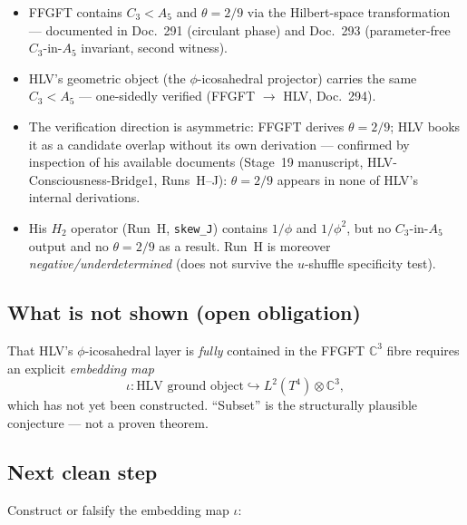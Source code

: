 \begin{itemize}
  \item FFGFT contains $C_3 < A_5$ and $\theta = 2/9$ via the
    Hilbert-space transformation --- documented in Doc.~291 (circulant
    phase) and Doc.~293 (parameter-free $C_3$-in-$A_5$ invariant, second
    witness).
  \item HLV's geometric object (the $\phi$-icosahedral projector) carries
    the same $C_3 < A_5$ --- one-sidedly verified (FFGFT $\to$ HLV,
    Doc.~294).
  \item The verification direction is asymmetric: FFGFT derives $\theta =
    2/9$; HLV books it as a candidate overlap without its own derivation
    --- confirmed by inspection of his available documents (Stage~19
    manuscript, HLV-Consciousness-Bridge1, Runs~H--J): $\theta = 2/9$
    appears in none of HLV's internal derivations.
  \item His $H_2$ operator (Run~H, \texttt{skew\_J}) contains $1/\phi$
    and $1/\phi^2$, but no $C_3$-in-$A_5$ output and no $\theta = 2/9$
    as a result. Run~H is moreover \emph{negative/underdetermined} (does
    not survive the $u$-shuffle specificity test).
\end{itemize}

\subsection*{What is not shown (open obligation)}

That HLV's $\phi$-icosahedral layer is \emph{fully} contained in the
FFGFT $\mathbb{C}^3$ fibre requires an explicit \emph{embedding map}
\begin{equation}
  \iota\colon \text{HLV ground object} \hookrightarrow
  L^2(T^4)\otimes\mathbb{C}^3,
\end{equation}
which has not yet been constructed. \enquote{Subset} is the structurally
plausible conjecture --- not a proven theorem.

\subsection*{Next clean step}

Construct or falsify the embedding map $\iota$:

